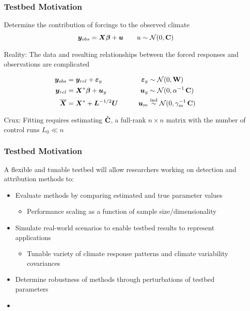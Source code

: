\documentclass{beamer}
\newcommand{\C}{\ensuremath{\text{Cov}}}
\def\*#1{\bm{#1}}
\def\C{\textbf{\text{C}}}
\def\W{\textbf{\text{W}}}
\begin{document}
\begin{frame}
\frametitle{Testbed Motivation}
 Determine the contribution of forcings to the observed climate
\[
\*y_{obs} = \*X \* \beta + \*u  \qquad u \sim \mathcal N(0, \C)
\]

\alert{Reality:} The data and resulting relationships between the forced responses and observations are complicated
\begin{block}{}
\vspace*{-\baselineskip}\setlength\belowdisplayshortskip{0pt}
\begin{alignat*}{3}
\*y_{obs} &= \*y_{rel} + \*\varepsilon_y  \qquad \quad &\*\varepsilon_y &\sim \mathcal N(0,\W)\\
\*y_{rel} &= \*X^* \*\beta + \*u_y \nonumber  \qquad  &\*u_y &\sim \mathcal N(0,\alpha^{-1}\,\C) \\
\overline{\*X} &= \*X^* + \*L^{-1/2} \*U \qquad    &\*u_m &\stackrel{\text{ind}}{\sim} \mathcal N(0,\gamma_m^{-1} \, \C)  \:
\end{alignat*}
\end{block}
\alert{Crux:} Fitting requires estimating $\hat{\C}$, a full-rank $n \times n$ matrix with the number of control runs $L_0 \ll n$

\end{frame}

\begin{frame}
\frametitle{Testbed Motivation}
A flexible and tunable testbed will allow researchers working on detection and attribution methods to:
\begin{itemize}
\item Evaluate methods by comparing estimated and true parameter values
\begin{itemize}
\item Performance scaling as a function of sample size/dimensionality
\end{itemize}
\item Simulate real-world scenarios to enable testbed results to represent applications
\begin{itemize}
\item Tunable variety of climate response patterns and climate variability covariances
\end{itemize}
\item Determine robustness of methods through perturbations of testbed parameters
\item {}

\end{itemize}

\end{frame}
\end{document}
